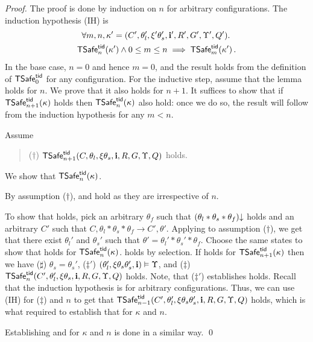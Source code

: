 \begin{proof}
The proof is done by induction on $n$ for   arbitrary configurations.
The induction hypothesis (IH) is
\begin{multline*}
\forall m,n,\kappa' = (C',\theta'_l,\xi'\theta'_s,{\bf i}',R',G',\Upsilon', Q').\,
\\
{\sf TSafe}^{{\sf tid}}_n(\kappa') \land 0 \leq m \leq n
\implies 
{\sf TSafe}^{{\sf tid}}_m(\kappa')\,. 
\end{multline*}
In the base case, $n=0$ and hence $m=0$, and the result holds from the definition of ${\sf TSafe}^{{\sf tid}}_0$
for any configuration.
For the inductive step, assume that the lemma holds for $n$.
We prove that it also holds for $n+1$.
It suffices to show that if  ${\sf TSafe}^{{\sf tid}}_{n+1}(\kappa)$ holds
then ${\sf TSafe}^{{\sf tid}}_n(\kappa)$ also hold:
once we do so, the result will follow from the induction hypothesis for any $m < n$.

Assume  
\begin{quotation}
($\dagger$) ${\sf TSafe}^{{\sf tid}}_{n+1}(C,\theta_l,\xi\theta_s,{\bf i},R,G,\Upsilon, Q)$ holds.
\end{quotation}
We show that ${\sf TSafe}^{{\sf tid}}_n(\kappa)$.

By assumption ($\dagger$),  and  
 hold as they are irrespective of $n$.

To show that  holds, pick an arbitrary  
$\theta_f$ such that $(\theta_l * \theta_s * \theta_f)\mathpunct{\downarrow}$ holds and
an arbitrary $C'$ such that $C,\theta_l * \theta_s * \theta_f \rightarrow C',\theta'$.
Applying  to assumption ($\dagger$),
we get that there exist $\theta_l'$ and $\theta_s'$ 
such that $\theta'=\theta_l'*\theta_s'*\theta_f$. 
Choose the same states to show that  holds for ${\sf TSafe}^{{\sf tid}}_{n}(\kappa)$.
 holds by selection.
If  holds for ${\sf TSafe}^{{\sf tid}}_{n+1}(\kappa)$
then we have ($\sharp$) 
$\theta_s = \theta_s'$,
($\ddag'$) $(\theta_l',\xi\theta_s\theta_s',{\bf i}) \vDash\Upsilon$,
and ($\ddag$) 
${\sf TSafe}^{{\sf tid}}_{n}(C',\theta'_l,\xi\theta_s,{\bf i},R,G,\Upsilon,Q)$ holds.
Note, that ($\ddag'$) establishes  holds.
Recall that the induction hypothesis is for arbitrary configurations.
Thus, we can use (IH) for  ($\ddag$) and $n$ to get that ${\sf TSafe}^{{\sf tid}}_{n-1}(C',\theta'_l,\xi\theta_s\theta_s',{\bf i},R,G,\Upsilon,Q)$
holds, which is what required to establish that  for $\kappa$ and $n$.

Establishing  and 
for $\kappa$ and $n$ is done in a similar way.
\qed\end{proof}


